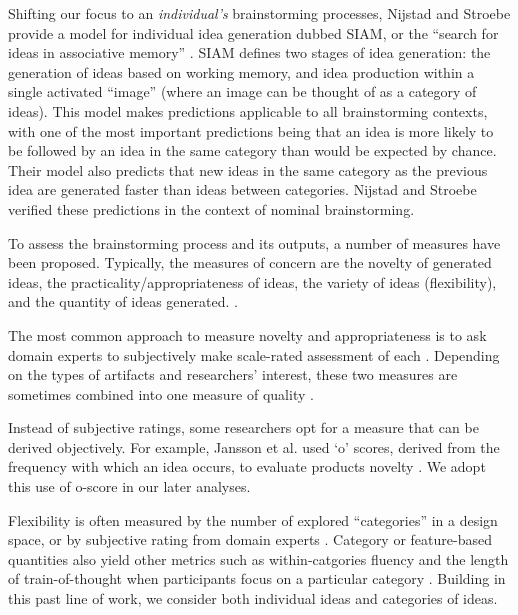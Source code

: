 Shifting our focus to an \emph{individual's} brainstorming processes, Nijstad and Stroebe provide a model for individual idea generation dubbed SIAM, or the ``search for ideas in associative memory'' \cite{nijstad_how_2006}. SIAM defines two stages of idea generation: the generation of ideas based on working memory, and idea production within a single activated ``image'' (where an image can be thought of as a category of ideas). This model makes predictions applicable to all brainstorming contexts, with one of the most important predictions being that an idea is more likely to be followed by an idea in the same category than would be expected by chance. Their model also predicts that new ideas in the same category as the previous idea are generated faster than ideas between categories. Nijstad and Stroebe verified these predictions in the context of nominal brainstorming.

To assess the brainstorming process and its outputs, a number of measures have been proposed. Typically, the measures of concern are the novelty of generated ideas, the practicality/appropriateness of ideas, the variety of ideas (flexibility), and the quantity of ideas generated. \cite{finke1992creative, shah2003metrics}.

The most common approach to measure novelty and appropriateness is to ask domain experts to subjectively make scale-rated assessment of each \cite{lewis2011affective, amabile_1983}. Depending on the types of artifacts and researchers' interest, these two measures are sometimes combined into one measure of quality \cite{little2010exploring}. 

Instead of subjective ratings, some researchers opt for a measure that can be derived objectively. For example, Jansson et al. used `o' scores, derived from the frequency with which an idea occurs, to evaluate products novelty \cite{jansson_design_1991}. We adopt this use of o-score in our later analyses.

Flexibility is often measured by the number of explored ``categories'' in a design space, or by subjective rating from domain experts \cite{lewis2011affective, marsh1996examples}. Category or feature-based quantities also yield other metrics such as within-catgories fluency and the length of train-of-thought when participants focus on a particular category \cite{nijstad_how_2006}. Building in this past line of work, we consider both individual ideas and categories of ideas.

